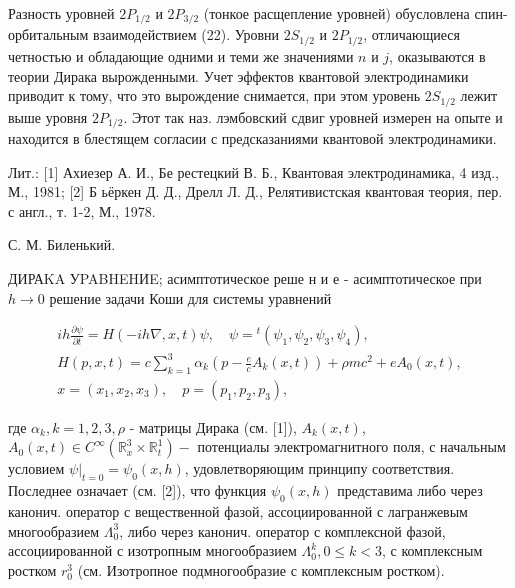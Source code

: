 \documentclass[10pt]{article}
\begin{document}
Разность уровней $2 P_{1 / 2}$ и $2 P_{3 / 2}$ (тонкое расщепление уровней) обусловлена спин-орбитальным взаимодействием (22). Уровни $2 S_{1 / 2}$ и $2 P_{1 / 2}$, отличающиеся четностью и обладающие одними и теми же значениями $n$ и $j$, оказываются в теории Дирака вырожденными. Учет эффектов квантовой электродинамики приводит к тому, что это вырождение снимается, при этом уровень $2 S_{1 / 2}$ лежит выше уровня $2 P_{1 / 2}$. Этот так наз. лэмбовский сдвиг уровней измерен на опыте и находится в блестящем согласии с предсказаниями квантовой электродинамики.



Лит.: [1] Ахиезер А. И., Бе рестецкий В. Б., Квантовая электродинамика, 4 изд., М., 1981; [2] Б ьёркен Д. Д., Дрелл Л. Д., Релятивистская квантовая теория, пер. с англ., т. 1-2, М., 1978.



С. М. Биленький.



ДИРАKA УPABHEHИE; асимптотическое реше н и е - асимптотическое при $h \rightarrow 0$ решение задачи Коши для системы уравнений



\[

\begin{gathered}

i h \frac{\partial \psi}{\partial t}=H(-i h \nabla, x, t) \psi, \quad \psi={ }^{t}\left(\psi_{1}, \psi_{2}, \psi_{3}, \psi_{4}\right), \\

H(p, x, t)=c \sum_{k=1}^{3} \alpha_{k}\left(p-\frac{e}{c} A_{k}(x, t)\right)+\rho m c^{2}+e A_{0}(x, t), \\

x=\left(x_{1}, x_{2}, x_{3}\right), \quad p=\left(p_{1}, p_{2}, p_{3}\right),

\end{gathered}

\]



где $\alpha_{k}, k=1,2,3, \rho$ - матрицы Дирака (см. [1]), $A_{k}(x, t)$, $A_{0}(x, t) \in C^{\infty}\left(\mathbb{R}_{x}^{3} \times \mathbb{R}_{t}^{1}\right)-$ потенциалы электромагнитного поля, с начальным условием $\left.\psi\right|_{t=0}=\psi_{0}(x, h)$, удовлетворяющим принципу соответствия. Последнее означает (см. [2]), что функция $\psi_{0}(x, h)$ представима либо через канонич. оператор с вещественной фазой, ассоциированной с лагранжевым многообразием $\Lambda_{0}^{3}$, либо через канонич. оператор с комплексной фазой, ассоциированной с изотропным многообразием $\Lambda_{0}^{k}, 0 \leqslant k<3$, с комплексным ростком $r_{0}^{3}$ (см. Изотропное подмногообразие с комплексным ростком).
\end{document}
